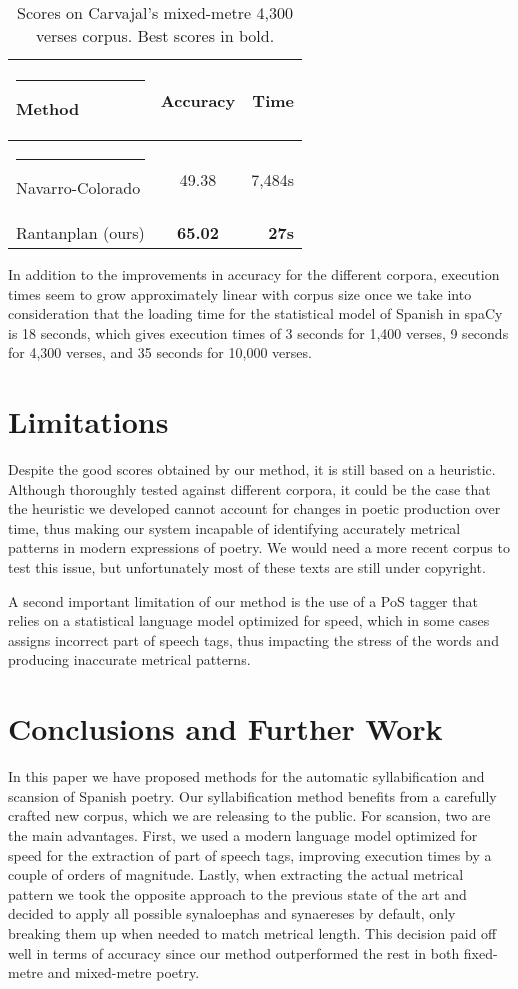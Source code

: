 \documentclass[a4paper,11pt,twocolumn,twoside]{article}
\begin{document}
\begin{table} [htbp]
\begin{center}
\begin{tabular} {lcr}
  \hline\rule{-2pt}{15pt}
  {\bf Method} & {\bf Accuracy} & {\bf Time}\\
  \hline\rule{-4pt}{10pt}
Navarro-Colorado & 49.38 & 7,484s \\
Rantanplan (ours) & \textbf{65.02} & \textbf{27s} \\
\hline
\end{tabular}
\end{center}
\caption{\label{table.4}Scores on Carvajal's mixed-metre 4,300 verses corpus. Best scores in bold.}
\end{table}

In addition to the improvements in accuracy for the different corpora, execution times seem to grow approximately linear with corpus size once we take into consideration that the loading time for the statistical model of Spanish in spaCy is 18 seconds, which gives execution times of 3 seconds for 1,400 verses, 9 seconds for 4,300 verses, and 35 seconds for 10,000 verses.

\section{Limitations}
Despite the good scores obtained by our method, it is still based on a heuristic. Although thoroughly tested against different corpora, it could be the case that the heuristic we developed cannot account for changes in poetic production over time, thus making our system incapable of identifying accurately metrical patterns in modern expressions of poetry. We would need a more recent corpus to test this issue, but unfortunately most of these texts are still under copyright.

A second important limitation of our method is the use of a PoS tagger that relies on a statistical language model optimized for speed, which in some cases assigns incorrect part of speech tags, thus impacting the stress of the words and producing inaccurate metrical patterns.

\section{Conclusions and Further Work}
In this paper we have proposed methods for the automatic syllabification and scansion of Spanish poetry. Our syllabification method benefits from a carefully crafted new corpus, which we are releasing to the public. For scansion, two are the main advantages. First, we used a modern language model optimized for speed for the extraction of part of speech tags, improving execution times by a couple of orders of magnitude. Lastly, when extracting the actual metrical pattern we took the opposite approach to the previous state of the art and decided to apply all possible synaloephas and synaereses by default, only breaking them up when needed to match metrical length. This decision paid off  well in terms of accuracy since our method outperformed the rest in both fixed-metre and mixed-metre poetry.
\end{document}
